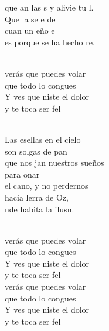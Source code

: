 \begin{cancion}
	que an las s y alivie tu l.\\
	Que la  se e de \\
	cuan un eño e\\
	es porque se ha hecho re.\\\jump\\
	\begin{chorus}%
	verás que puedes volar\\
	que todo lo congues\\
	Y ves que niste el dolor \\
	y te toca ser fel\\
	\end{chorus}%
	\jump\\
	Las esellas en el cielo\\
	son solgas de pan\\
	que nos jan nuestros sueños\\
	para onar\\
	el cano, y no perdernos\\
	hacia lerra de Oz,\\
	nde habita la ilusn. \\\jump\\
	\begin{chorus}%
	verás que puedes volar\\
	que todo lo congues\\
	Y ves que niste el dolor \\
	y te toca ser fel\\
	verás que puedes volar\\
	que todo lo congues\\
	Y ves que niste el dolor \\
	y te toca ser fel\\
	\end{chorus}%
	\jump\\
\end{cancion}%
